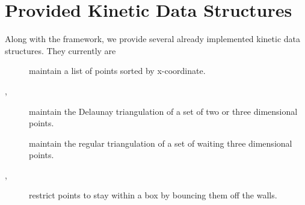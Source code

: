 \section{Provided Kinetic Data Structures}
\label{sec:provided_kdss}

Along with the framework, we provide several already implemented kinetic data structures. They currently are 
\begin{description}
\item[] maintain a list of points
sorted by x-coordinate.
\item[,] maintain the Delaunay triangulation of a set of two
or three dimensional points.
\item[] maintain the regular triangulation of a set of waiting
three dimensional points.
\item[,
] restrict points to stay within
a box by bouncing them off the walls.
\end{description}







